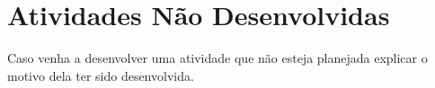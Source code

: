 

\section{Atividades Não Desenvolvidas}
    \label{sec:atividades-nao-desenvolvidas}
    
    Caso venha a desenvolver uma atividade que não esteja planejada explicar o motivo dela ter sido desenvolvida.